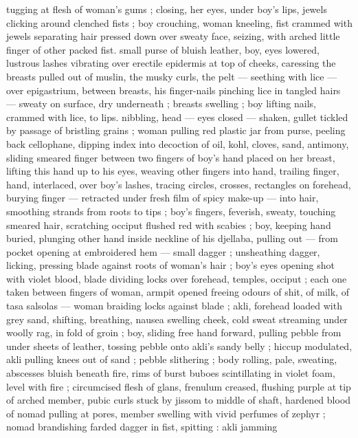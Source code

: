 tugging at flesh of woman's gums ; closing, her eyes, under boy's 
lips, jewels clicking around clenched fists ; boy crouching, woman 
kneeling, fist crammed with jewels separating hair pressed down over 
sweaty face, seizing, with arched little finger of other packed fist. 
small purse of bluish leather, boy, eyes lowered, lustrous lashes 
vibrating over erectile epidermis at top of cheeks, caressing the 
breasts pulled out of muslin, the musky curls, the pelt --- seething 
with lice --- over epigastrium, between breasts, his finger-nails 
pinching lice in tangled hairs --- sweaty on surface, dry underneath 
; breasts swelling ; boy lifting nails, crammed with lice, to lips. 
nibbling, head --- eyes closed --- shaken, gullet tickled by passage 
of bristling grains ; woman pulling red plastic jar from purse, peeling 
back cellophane, dipping index into decoction of oil, kohl, cloves, 
sand, antimony, sliding smeared finger between two fingers of boy's 
hand placed on her breast, lifting this hand up to his eyes, weaving 
other fingers into hand, trailing finger, hand, interlaced, over boy's 
lashes, tracing circles, crosses, rectangles on forehead, burying 
finger --- retracted under fresh film of spicy make-up --- into hair, 
smoothing strands from roots to tips ; boy's fingers, feverish, sweaty, 
touching smeared hair, scratching occiput flushed red with scabies ; 
boy, keeping hand buried, plunging other hand inside neckline of his 
djellaba, pulling out --- from pocket opening at embroidered hem --- 
small dagger ; unsheathing dagger, licking, pressing blade against 
roots of woman's hair ; boy's eyes opening shot with violet blood, 
blade dividing locks over forehead, temples, occiput ; each one taken 
between fingers of woman, armpit opened freeing odours of shit, of 
milk, of tasa salsolas --- woman braiding locks against blade ; akli, 
forehead loaded with grey sand, shifting, breathing, nausea swelling 
cheek, cold sweat streaming under woolly rag, in fold of groin ; boy, 
sliding free hand forward, pulling pebble from under sheets of 
leather, tossing pebble onto akli's sandy belly ; hiccup modulated, 
akli pulling knees out of sand ; pebble slithering ; body rolling, pale, 
sweating, abscesses bluish beneath fire, rims of burst buboes 
scintillating in violet foam, level with fire ; circumcised flesh of glans, 
frenulum creased, flushing purple at tip of arched member, pubic 
curls stuck by jissom to middle of shaft, hardened blood of nomad 
pulling at pores, member swelling with vivid perfumes of zephyr ; 
nomad brandishing farded dagger in fist, spitting : akli jamming 
